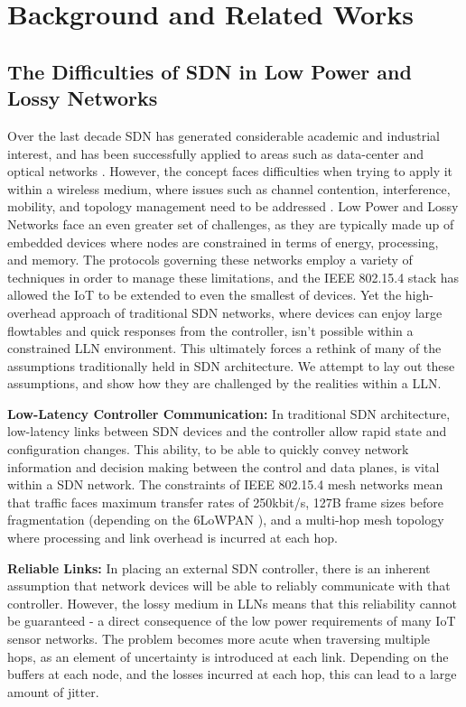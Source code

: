 \section{Background and Related Works}
\label{sec_background}

\subsection{The Difficulties of SDN in Low Power and Lossy Networks}
\label{sec_sdn_background}

Over the last decade SDN has generated considerable academic and industrial interest, and has been successfully applied to areas such as data-center and optical networks \cite{sdn_comprehensive_survey}. However, the concept faces difficulties when trying to apply it within a wireless medium, where issues such as channel contention, interference, mobility, and topology management need to be addressed \cite{sdwn_opportunities_challenges}. Low Power and Lossy Networks face an even greater set of challenges, as they are typically made up of embedded devices where nodes are constrained in terms of energy, processing, and memory. The protocols governing these networks employ a variety of techniques in order to manage these limitations, and the IEEE 802.15.4 stack has allowed the IoT to be extended to even the smallest of devices. Yet the high-overhead approach of traditional SDN networks, where devices can enjoy large flowtables and quick responses from the controller, isn't possible within a constrained LLN environment. This ultimately forces a rethink of many of the assumptions traditionally held in SDN architecture. We attempt to lay out these assumptions, and show how they are challenged by the realities within a LLN.

\textbf{Low-Latency Controller Communication:} In traditional SDN architecture, low-latency links between SDN devices and the controller allow rapid state and configuration changes. This ability, to be able to quickly convey network information and decision making between the control and data planes, is vital within a SDN network. The constraints of IEEE 802.15.4 mesh networks mean that traffic faces maximum transfer rates of 250kbit/s, 127B frame sizes before fragmentation (depending on the 6LoWPAN \cite{6lowpan_rfc}), and a multi-hop mesh topology where processing and link overhead is incurred at each hop.

\textbf{Reliable Links:} In placing an external SDN controller, there is an inherent assumption that network devices will be able to reliably communicate with that controller. However, the lossy medium in LLNs means that this reliability cannot be guaranteed - a direct consequence of the low power requirements of many IoT sensor networks. The problem becomes more acute when traversing multiple hops, as an element of uncertainty is introduced at each link. Depending on the buffers at each node, and the losses incurred at each hop, this can lead to a large amount of jitter.

